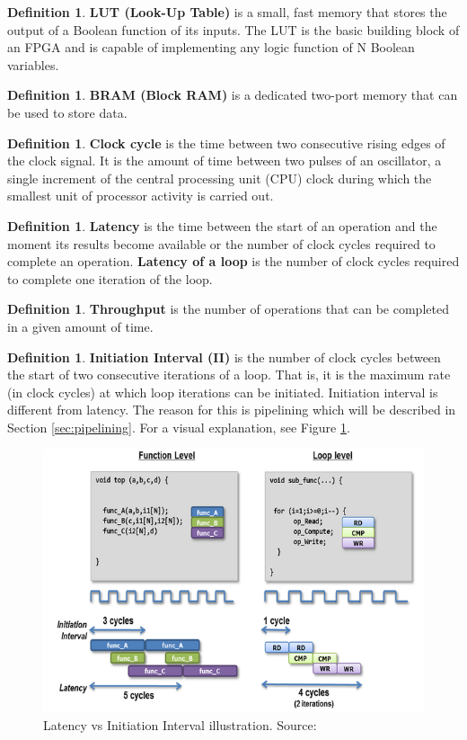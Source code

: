 \documentclass[a4paper, twoside]{report}
\theoremstyle{definition}
\newtheorem{definition}[theorem]{Definition}
\numberwithin{equation}{section}
\begin{document}
\begin{definition}
    \textbf{LUT (Look-Up Table)} is a small, fast memory that stores the output of a Boolean function of its inputs.
    The LUT is the basic building block of an FPGA and is capable of implementing any logic function of N Boolean variables.
\end{definition}
\begin{definition}
    \textbf{BRAM (Block RAM)} is a dedicated two-port memory that can be used to store data.
\end{definition}
\begin{definition}
    \textbf{Clock cycle} is the time between two consecutive rising edges of the clock signal.
    It is the amount of time between two pulses of an oscillator, a single increment of the
    central processing unit (CPU) clock during which the smallest unit of processor activity
    is carried out.
\end{definition}
\begin{definition}
    \textbf{Latency} is the time between the start of an operation and the moment its results become available
    or the number of clock cycles required to complete an operation.
    \textbf{Latency of a loop} is the number of clock cycles required to complete one iteration of the loop.
\end{definition}
\begin{definition}
    \textbf{Throughput} is the number of operations that can be completed in a given amount of time.
\end{definition}
\begin{definition}
    \textbf{Initiation Interval (II)} is the number of clock cycles between the start of two consecutive iterations of a loop.
    That is, it is the maximum rate (in clock cycles) at which loop iterations can be initiated.
    Initiation interval is different from latency.
    The reason for this is pipelining which will be described in Section \ref{sec:pipelining}.
    For a visual explanation, see Figure \ref{fig:latency_vs_ii}.
\end{definition}

\begin{figure}[h!]
    \centering
    \includegraphics[scale=0.7]{iiandlatency.png}
    \caption{Latency vs Initiation Interval illustration. Source: \cite{VitisYork}}
    \label{fig:latency_vs_ii}
\end{figure}
\end{document}
